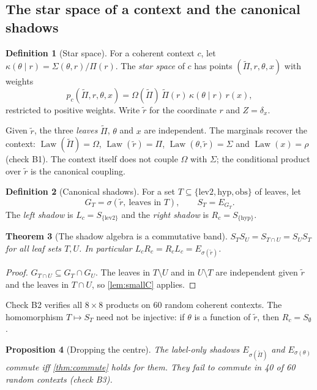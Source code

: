 \documentclass[11pt]{article}
\newtheorem{theorem}{Theorem}[section]
\newtheorem{proposition}[theorem]{Proposition}
\theoremstyle{definition}
\newtheorem{definition}[theorem]{Definition}
\newcommand{\Law}{\operatorname{Law}}
\newcommand{\Pt}{\widetilde\Pi}
\newcommand{\rr}{\tilde r}
\begin{document}
\subsection{The star space of a context and the canonical shadows}
\begin{definition}[Star space]\label{def:star}
For a coherent context $c$, let $\kappa(\theta\mid r)=\Sigma(\theta,r)/\Pi(r)$. The \emph{star space} of $c$ has points
$(\Pt,r,\theta,x)$ with weights
\[
p_c(\Pt,r,\theta,x)=\Omega(\Pt)\,\Pt(r)\,\kappa(\theta\mid r)\,r(x),
\]
restricted to positive weights. Write $\rr$ for the coordinate $r$ and $Z=\delta_x$.
\end{definition}

Given $\rr$, the three \emph{leaves} $\Pt$, $\theta$ and $x$ are independent. The marginals recover the context:
$\Law(\Pt)=\Omega$, $\Law(\rr)=\Pi$, $\Law(\theta,\rr)=\Sigma$ and $\Law(x)=\rho$ (check B1). The context itself does not couple $\Omega$
with $\Sigma$; the conditional product over $\rr$ is the canonical coupling.

\begin{definition}[Canonical shadows]\label{def:shadows}
For a set $T\subseteq\{\mathrm{lev2},\mathrm{hyp},\mathrm{obs}\}$ of leaves, let
\[
G_T=\sigma(\rr,\ \text{leaves in }T),\qquad S_T=E_{G_T}.
\]
The \emph{left shadow} is $L_c=S_{\{\mathrm{lev2}\}}$ and the \emph{right shadow} is $R_c=S_{\{\mathrm{hyp}\}}$.
\end{definition}

\begin{theorem}[The shadow algebra is a commutative band]\label{thm:band}
$S_TS_U=S_{T\cap U}=S_US_T$ for all leaf sets $T,U$. In particular $L_cR_c=R_cL_c=E_{\sigma(\rr)}$.
\end{theorem}
\begin{proof}
$G_{T\cap U}\subseteq G_T\cap G_U$. The leaves in $T\setminus U$ and in $U\setminus T$ are independent given $\rr$ and the leaves in
$T\cap U$, so \cref{lem:smallC} applies.
\end{proof}

Check B2 verifies all $8\times8$ products on 60 random coherent contexts. The homomorphism $T\mapsto S_T$ need not be injective: if
$\theta$ is a function of $\rr$, then $R_c=S_\emptyset$.

\begin{proposition}[Dropping the centre]\label{prop:no-centre}
The label-only shadows $E_{\sigma(\Pt)}$ and $E_{\sigma(\theta)}$ commute iff \cref{thm:commute} holds for them. They fail to commute in
40 of 60 random contexts (check B3).
\end{proposition}
\end{document}
